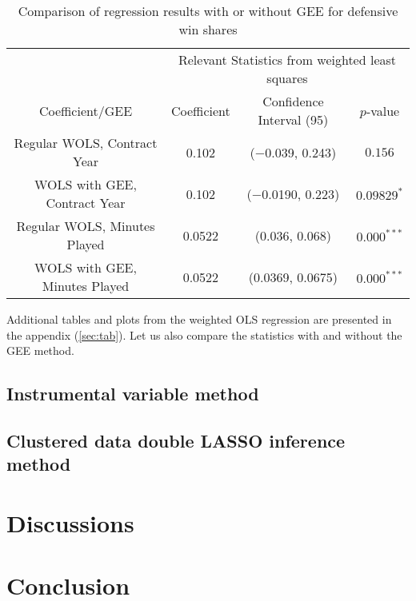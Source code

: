 \documentclass[12pt]{article}
\begin{document}
	\begin{table}[!htbp]
		\centering
		\caption{Comparison of regression results with or without GEE for defensive win shares}
		\label{geelmcomparisond} 
		\begin{tabular}{*4c}
			\toprule
			& \multicolumn{3}{c}{Relevant Statistics from weighted least squares} \\
			\cmidrule(lr){2-4}
			Coefficient/GEE & Coefficient  & Confidence Interval (95) & $p$-value \\
			\midrule
			Regular WOLS, Contract Year & 0.102       & ($-$0.039, 0.243) & $0.156$       \\
			WOLS with GEE, Contract Year & 0.102      & ($-$0.0190, 0.223)       & $0.09829^{*}$ \\
			Regular WOLS, Minutes Played & 0.0522       & (0.036, 0.068) & $0.000^{***}$ \\
			WOLS with GEE, Minutes Played & 0.0522 & (0.0369, 0.0675)       & $0.000^{***}$       \\
			\bottomrule
		\end{tabular}
	\end{table}
	
	Additional tables and plots from the weighted OLS regression are presented in the appendix (\ref{sec:tab}). Let us also compare the statistics with and without the GEE method.
	
	\pagebreak
	
	\subsection{Instrumental variable method}
	
	\subsection{Clustered data double LASSO inference method}
	
	\section{Discussions} \label{sec:discussion}
	
	\section{Conclusion} \label{sec:conclusion}
	
	\clearpage
	
	\singlespacing
	
	
	
\end{document}
